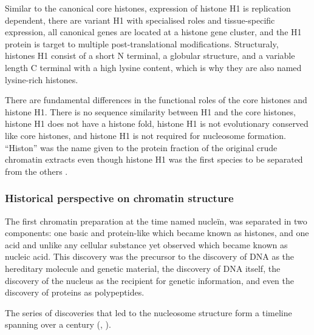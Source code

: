       Similar to the canonical core histones, expression of histone H1 is
      replication dependent, there are variant H1 with specialised
      roles and tissue-specific expression, all canonical genes
      are located at a histone gene cluster, and the H1 protein
      is target to multiple post-translational modifications.
      Structuraly, histones H1 consist of a short N terminal, a globular
      structure, and a variable length C terminal with a high lysine
      content, which is why they are also named lysine-rich histones.

      There are fundamental differences in the functional roles of
      the core histones and histone H1.
      There is no sequence similarity between H1 and the core histones,
      histone H1 does not have a histone fold,
      histone H1 is not evolutionary conserved like core histones,
      and histone H1 is not required for nucleosome formation.
      ``Histon'' was the name given to the protein fraction of
      the original crude chromatin extracts \citep{kossel1884-histones}
      even though histone H1 was the first species to be separated from
      the others \citep{stedman1951main-histones-separation}.

    \subsubsection{Historical perspective on chromatin structure}

      The first chromatin preparation \citep{kossel1884-histones}
      at the time named nucleïn, was
      separated in two components: one basic and protein-like which
      became known as histones, and one acid and unlike any cellular
      substance yet observed which became known as nucleic acid.
      This discovery was the precursor to the discovery of DNA as the hereditary
      molecule and genetic material, the discovery of DNA itself,
      the discovery of the nucleus as the recipient for genetic
      information, and even the discovery of proteins as polypeptides.

      The series of discoveries that led to the nucleosome
      structure form a timeline spanning over a century
      (,
      \cite{vanHolde-chapter1}).

